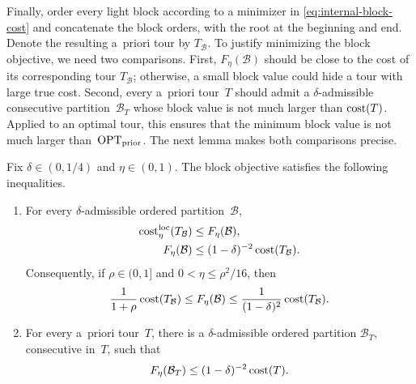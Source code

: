\documentclass[12pt,a4paper,oneside]{report}
\begin{document}
Finally, order every light block according to a minimizer in
\cref{eq:internal-block-cost} and concatenate the block orders, with the root
at the beginning and end.  Denote the resulting a~priori tour by
$T_{\mathcal B}$.  To justify minimizing the block objective, we need two
comparisons.  First, $F_\eta(\mathcal B)$ should be close to the cost of its
corresponding tour $T_{\mathcal B}$; otherwise, a small block value could hide
a tour with large true cost.  Second, every a~priori tour~$T$ should admit a
$\delta$-admissible consecutive partition~$\mathcal B_T$ whose block value is not much
larger than $\operatorname{cost}(T)$.  Applied to an optimal tour, this ensures that the
minimum block value is not much larger than~$\operatorname{OPT}_\mathrm{prior}$.  The next lemma makes
both comparisons precise.

\begin{lemma}\label{lem:block-objective-bounds}
Fix $\delta\in(0,1/4)$ and $\eta\in(0,1)$.
The block objective satisfies the following inequalities.
\begin{enumerate}[label=(\roman*)]
    \item For every $\delta$-admissible ordered partition~$\mathcal B$,
    \begin{align}
        \operatorname{cost}^{\operatorname{loc}}_{\eta}(T_{\mathcal B})
        &\le F_\eta(\mathcal B),
        \label{eq:block-objective-dominates-local}\\
        F_\eta(\mathcal B)
        &\le(1-\delta)^{-2}\operatorname{cost}(T_{\mathcal B}).
        \label{eq:block-objective-faithful-upper}
    \end{align}
    Consequently, if $\rho\in(0,1]$ and
    $0<\eta\le\rho^2/16$, then
    \begin{equation}\label{eq:block-objective-two-sided}
        \frac{1}{1+\rho}\operatorname{cost}(T_{\mathcal B})
        \le F_\eta(\mathcal B)
        \le \frac{1}{(1-\delta)^2}\operatorname{cost}(T_{\mathcal B}).
    \end{equation}

    \item For every a~priori tour~$T$, there is a $\delta$-admissible ordered
    partition $\mathcal B_T$, consecutive in~$T$, such that
    \begin{equation}\label{eq:block-objective-from-order}
        F_\eta(\mathcal B_T)
        \le(1-\delta)^{-2}\operatorname{cost}(T).
    \end{equation}
\end{enumerate}
\end{lemma}
\end{document}
